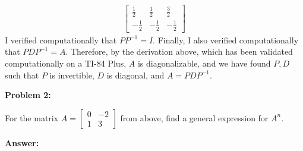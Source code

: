 \documentclass[10pt,letterpaper,final]{report}
\begin{document}
\begin{enumerate}[label=(\alph*)]
\begin{align*}
\begin{bmatrix}
                     \frac{1}{2}  & \frac{1}{2}  & \frac{3}{2}  \\
                     -\frac{1}{2} & -\frac{1}{2} & -\frac{1}{2}
                   \end{bmatrix}
        \end{align*}
        I verified computationally that $PP^{-1} = I$. Finally, I also verified computationally that $PDP^{-1} = A$. Therefore, by the derivation above, which has been validated computationally on a TI-84 Plus, $A$ is diagonalizable, and we have found $P, D$ such that $P$ is invertible, $D$ is diagonal, and $A = PDP^{-1}$.
\end{enumerate}

\pagebreak

\noindent\textbf{Problem 2:}
\medskip

For the matrix $A = \begin{bmatrix}
    0 & -2 \\
    1 & 3
  \end{bmatrix}$ from above, find a general expression for $A^n$.

\medskip
\noindent\textbf{Answer:}
\end{document}
